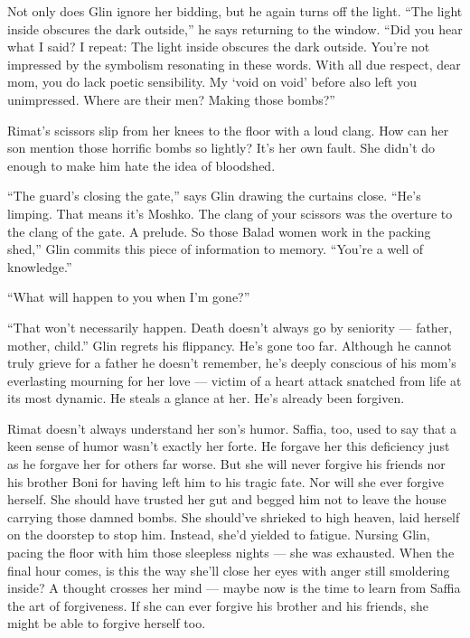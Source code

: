 \documentclass[twoside,11pt,openany]{book}
\begin{document}
{Not only does Glin
ignore her bidding, but he again turns off the light. ``The light
inside obscures the dark outside,'' he says returning to the
window. ``Did you hear what I said? I
repeat: The light inside
obscures the dark outside. You're not impressed by the symbolism
resonating in these words. With all due respect, dear mom, you do
lack poetic sensibility. My `void on void' before also left you
unimpressed. Where are their men?
Making those bombs?''

Rimat's scissors slip from her knees to the floor with a loud clang. How can her son mention those horrific bombs so
lightly? It's her own fault. She didn't do enough to make him hate the idea of bloodshed.

``The guard's closing the gate,'' says Glin drawing the curtains close. ``He's limping. That means
it's Moshko. The clang of your scissors was the overture to the clang of the gate. A prelude. So those Balad women
work in the packing shed,'' Glin commits this piece of information to memory. ``You're a well of
knowledge.''

``What will happen to you when I'm gone?''

``That won't necessarily happen. Death doesn't always go by seniority --- father, mother, child.'' Glin regrets his
flippancy. He's gone too far. Although he cannot truly grieve for a father he doesn't remember, he's deeply
conscious of his mom's everlasting mourning for her love ---  victim of a heart attack snatched from life at its
most dynamic. He steals a glance at her. He's already been forgiven.

{Rimat doesn't always understand her son's humor. Saffia, too, used to
say that a keen sense of humor wasn't exactly her forte. }He forgave her this deficiency just as he forgave her for
others far worse. But she will never forgive his friends nor his brother Boni for having left him to his tragic fate.
Nor will she ever forgive herself. She should have trusted her gut and begged him not to leave the house carrying
those damned bombs. She should've shrieked to high heaven, laid herself on the doorstep to stop him. Instead,
she'd yielded to fatigue. Nursing Glin, pacing the floor with him those sleepless nights --- she was exhausted. When
the final hour comes, is this the way she'll close her eyes with anger still smoldering inside? A thought crosses
her mind --- maybe now is the time to learn from Saffia the art of forgiveness. If she can ever forgive his brother
and{ his friends, she might be able to forgive herself too. }

}
\end{document}
